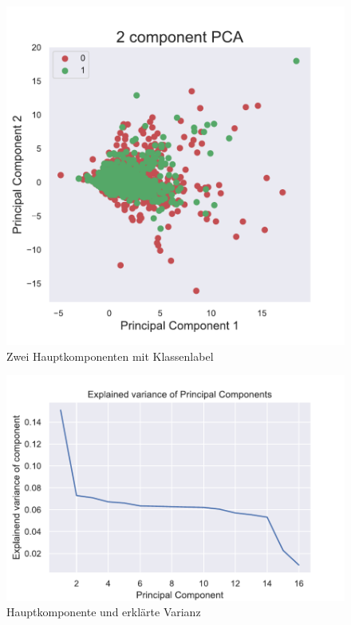 \begin{figure}[!htbp]
\begin{center}
\includegraphics[scale=0.5]{pdf/pca.pdf}
\end{center}
\caption{Zwei Hauptkomponenten mit Klassenlabel}
\label{fig:pca}
\end{figure}

\begin{figure}[!htbp]
\begin{center}
\includegraphics[scale=0.5]{pdf/pca2.pdf}
\end{center}
\caption{Hauptkomponente und erklärte Varianz}
\label{fig:pca2}
\end{figure}


